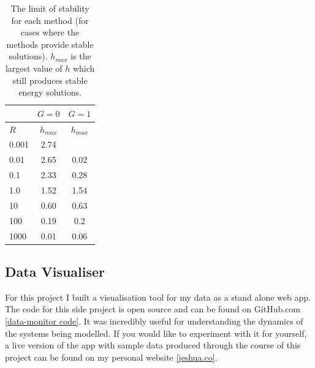 \documentclass[11pt]{article}
\begin{document}
\begin{table}[ht]
	\centering
	\begin{tabular}{ l c c }
		& $G=0$ & $G=1$ \\ \hline
		$R$ & $h_{max}$ & $h_{max}$ \\ \hline
		0.001 & 2.74 & \text{unstable} \\
		0.01 & 2.65 & 0.02 \\
		0.1 & 2.33 & 0.28 \\
		1.0 & 1.52 & 1.54 \\
		10 & 0.60 & 0.63 \\
		100 & 0.19 & 0.2 \\
		1000 & 0.01 & 0.06 
	\end{tabular}
	\caption{The limit of stability for each method (for cases where the methods provide stable solutions). $h_{max}$ is the largest value of $h$ which still produces stable energy solutions.}
	\label{tab:dp_stability}
\end{table}

\subsection*{Data Visualiser}

For this project I built a visualisation tool for my data as a stand alone web app. The code for this side project is open source and can be found on GitHub.com \ref{data-monitor code}. It was incredibly useful for understanding the dynamics of the systems being modelled. If you would like to experiment with it for yourself, a live version of the app with sample data produced through the course of this project can be found on my personal website \ref{jeshua.co}.
\end{document}
